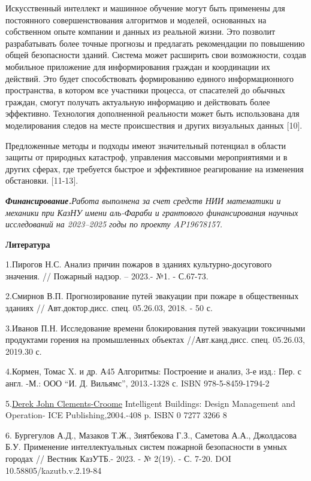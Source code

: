 \documentclass[
]{article}
\begin{document}
Искусственный интеллект и машинное обучение могут быть применены для
постоянного совершенствования алгоритмов и моделей, основанных на
собственном опыте компании и данных из реальной жизни. Это позволит
разрабатывать более точные прогнозы и предлагать рекомендации по
повышению общей безопасности зданий. Система может расширить свои
возможности, создав мобильное приложение для информирования граждан и
координации их действий. Это будет способствовать формированию единого
информационного пространства, в котором все участники процесса, от
спасателей до обычных граждан, смогут получать актуальную информацию и
действовать более эффективно. Технология дополненной реальности может
быть использована для моделирования следов на месте происшествия и
других визуальных данных {[}10{]}.

Предложенные методы и подходы имеют значительный потенциал в области
защиты от природных катастроф, управления массовыми мероприятиями и в
других сферах, где требуется быстрое и эффективное реагирование на
изменения обстановки. {[}11-13{]}.

\emph{\textbf{Финансирование.}Работа выполнена за счет средств НИИ
математики и механики при КазНУ имени аль-Фараби и грантового
финансирования научных исследований на 2023--2025 годы по проекту
AP19678157.}

\textbf{Литература}

1.Пирогов Н.С. Анализ причин пожаров в зданиях культурно-досугового
значения. // Пожарный надзор. -- 2023.- №1. - С.67-73.

2.Смирнов В.П. Прогнозирование путей эвакуации при пожаре в общественных
зданиях // Авт.доктор.дисс. спец. 05.26.03, 2018. - 50 с.

3.Иванов П.Н. Исследование времени блокирования путей эвакуации
токсичными продуктами горения на промышленных объектах //Авт.канд.дисс.
спец. 05.26.03, 2019.30 с.

4.Кормен, Томас X. и др. А45 Алгоритмы: Построение и анализ, 3-е изд.:
Пер. с англ. -М.: ООО ``И. Д. Вильямс'', 2013.-1328 с. ISBN
978-5-8459-1794-2

5.\href{https://www.researchgate.net/profile/Derek-Clements-Croome}{Derek
John Clements-Croome} Intelligent Buildings: Design Management and
Operation- ICE Publishing,2004.-408 p. ISBN 0 7277 3266 8

6. Бургегулов А.Д., Мазаков Т.Ж., Зиятбекова Г.З., Саметова А.А.,
Джолдасова Б.У. Применение интеллектуальных систем пожарной безопасности
в умных городах // Вестник КазУТБ.- 2023. - № 2(19). - С. 7-20. DOI
10.58805/kazutb.v.2.19-84
\end{document}
